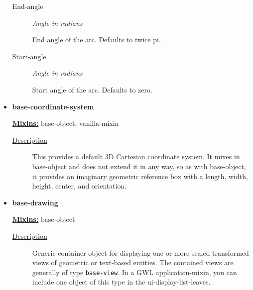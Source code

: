 \documentclass [11pt]{book}
\begin{document}
\begin{itemize}
\begin{description}
\item [End-angle]
\emph{Angle in radians}

 End angle of the arc. Defaults to twice pi.




\item [Start-angle]
\emph{Angle in radians}

 Start angle of the arc. Defaults to zero.




\end{description}







\item {}
\label{prim:base-coordinate-system}
\textbf{base-coordinate-system}


\textbf{
\underline{Mixins:}} base-object, vanilla-mixin





\begin{description}

\item [
\underline{Description}]


This provides a default 3D Cartesian
   coordinate system. It mixes in base-object and does not extend it
   in any way, so as with base-object, it provides an imaginary
   geometric reference box with a length, width, height, center, and
   orientation.



\end{description}









\item {}
\label{prim:base-drawing}
\textbf{base-drawing}


\textbf{
\underline{Mixins:}} base-object





\begin{description}

\item [
\underline{Description}]


Generic container object for displaying one or more scaled
transformed views of geometric or text-based entities. The contained views are generally 
of type \texttt{base-view}. In a GWL application-mixin, you can include one 
object of this type in the ui-display-list-leaves.


\end{description}
\end{itemize}
\end{document}
